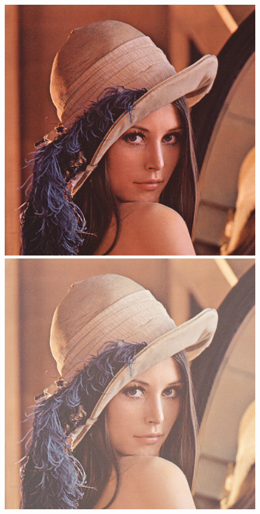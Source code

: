 \documentclass{article}
\begin{document}
\begin{figure}[!htb]
\centering
\includegraphics[scale=0.269]{img/lena_24bit.png} 
\includegraphics[scale=0.2]{img/_Pierwiastkowanie_Obrazu_lena_24bit.png}\\

\end{figure}
\end{document}
